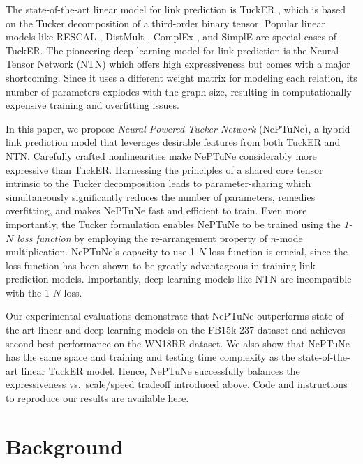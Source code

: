 \documentclass[11pt]{article}
\begin{document}
The state-of-the-art linear model for link prediction is TuckER \cite{balavzevic2019tucker}, which is based on the Tucker decomposition \cite{tucker1966some,tucker1964extension} of a third-order binary tensor. 
Popular linear models like RESCAL \cite{nickel2011three}, DistMult \cite{yang2014embedding}, ComplEx \cite{trouillon2016complex}, and SimplE \cite{poole2018simple} are special cases of TuckER. 
The pioneering deep learning model for link prediction is the Neural Tensor Network (NTN) \cite{socher2013reasoning} which offers high expressiveness but comes with a major shortcoming.
Since it uses a different weight matrix for modeling each relation, its number of parameters explodes with the graph size, resulting in computationally expensive training and overfitting issues.



In this paper, we propose \textit{Neural Powered Tucker Network} (NePTuNe), a hybrid link prediction model that leverages desirable features from both TuckER and NTN. 
Carefully crafted nonlinearities make NePTuNe considerably more expressive than TuckER. 
Harnessing the principles of a shared core tensor intrinsic to the Tucker decomposition leads to parameter-sharing which simultaneously significantly reduces the number of parameters, remedies overfitting, and makes NePTuNe fast and efficient to train.
Even more importantly, the Tucker formulation enables NePTuNe to be trained using the {\em 1-$N$ loss function} by employing the re-arrangement property of $n$-mode multiplication. 
NePTuNe's capacity to use 1-$N$ loss function is crucial, since the loss function has been shown to be greatly advantageous in training link prediction models.
Importantly, deep learning models like NTN are incompatible with the 1-$N$ loss.

Our experimental evaluations demonstrate that NePTuNe outperforms state-of-the-art linear and deep learning models on the FB15k-237 dataset \cite{toutanova2015representing} and achieves second-best performance on the WN18RR \cite{dettmers2018convolutional} dataset. 
We also show that NePTuNe has the same space and training and testing time complexity as the state-of-the-art linear TuckER model. 
Hence, NePTuNe successfully balances the expressiveness vs.\ scale/speed tradeoff introduced above.
Code and instructions to reproduce our results are available \textcolor{blue}{\href{https://github.com/luffycodes/neptune}{here}}.

\section{Background}
\end{document}
